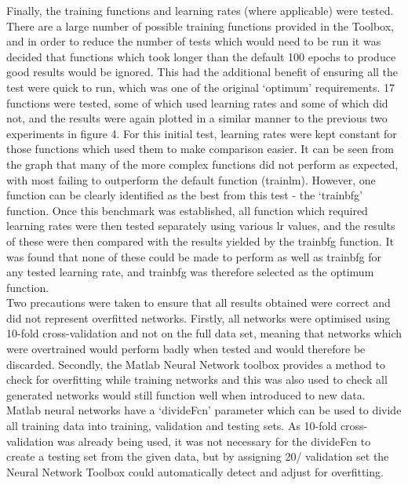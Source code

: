 \documentclass[a4paper]{article}
\begin{document}
Finally, the training functions and learning rates (where applicable) were tested. There are a large number of possible training functions
provided in the Toolbox, and in order to reduce the number of tests which would need to be run it was decided that functions which took longer
than the default 100 epochs to produce good results would be ignored. This had the additional benefit of ensuring all the test were quick to run,
which was one of the original `optimum' requirements. 17 functions were tested, some of which used learning rates and some of which did not, and
the results were again plotted in a similar manner to the previous two experiments in figure 4. For this initial test, learning rates were kept
constant for those functions which used them to make comparison easier. It can be seen from the graph that many of the more complex functions
did not perform as expected, with most failing to outperform the default function (trainlm). However, one function can be clearly identified
as the best from this test - the `trainbfg' function. Once this benchmark was established, all function which required learning rates were then
tested separately using various lr values, and the results of these were then compared with the results yielded by the trainbfg function.
It was found that none of these could be made to perform as well as trainbfg for any tested learning rate, and trainbfg was therefore selected
as the optimum function.\\ 

Two precautions were taken to ensure that all results obtained were correct and did not represent overfitted networks. Firstly, all networks were
optimised using 10-fold cross-validation and not on the full data set, meaning that networks which were overtrained would perform badly when tested
and would therefore be discarded. Secondly, the Matlab Neural Network toolbox provides a method to check for overfitting while training networks and
this was also used to check all generated networks would still function well when introduced to new data. Matlab neural networks have a `divideFcn'
parameter which can be used to divide all training data into training, validation and testing sets. As 10-fold cross-validation was already being
used, it was not necessary for the divideFcn to create a testing set from the given data, but by assigning 20/%
validation set the Neural Network Toolbox could automatically detect and adjust for overfitting.\\ 

\end{document}
